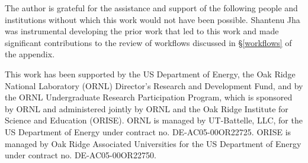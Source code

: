 \begin{acks}

The author is grateful for the assistance and
support of the following people and institutions without which this work would
not have been possible. Shantenu Jha was instrumental developing the prior work that led to this work and made significant contributions to the review of workflows discussed in \S \ref{workflows} of the appendix.

This work has been supported by the US Department of Energy, the Oak Ridge National Laboratory (ORNL) Director's Research and Development Fund, and by the ORNL
Undergraduate Research Participation Program, which is sponsored by ORNL and
administered jointly by ORNL and the Oak Ridge Institute for Science and
Education (ORISE). ORNL is managed by UT-Battelle, LLC, for the US Department
of Energy under contract no. DE-AC05-00OR22725. ORISE is managed by Oak Ridge
Associated Universities for the US Department of Energy under contract no.
DE-AC05-00OR22750.

\end{acks}